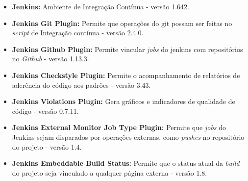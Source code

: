 \begin{apendicesenv}
\begin{itemize}
	\item \textbf{Jenkins:}	Ambiente de Integração Contínua - versão 1.642. 
	\item \textbf{Jenkins Git Plugin:}	Permite que operações do git possam ser feitas no \textit{script} de Integração contínua - versão 2.4.0.
	\item \textbf{Jenkins Github Plugin:}	Permite vincular \textit{jobs} do jenkins com repositórios no \textit{Github} - versão 1.13.3.
	\item \textbf{Jenkins Checkstyle Plugin:} Permite o acompanhamento de relatórios de aderência do código aos padrões - versão 3.43.
	\item \textbf{Jenkins Violations Plugin:} Gera gráficos e indicadores de qualidade de código - versão 0.7.11.
	\item \textbf{Jenkins External Monitor Job Type Plugin:} Permite que \textit{jobs} do Jenkins sejam disparados por operações externas, como \textit{pushes} no repositório do projeto - versão 1.4.
	\item \textbf{Jenkins Embeddable Build Status:} Permite que o status atual da \textit{build} do projeto seja vinculado a qualquer página externa - versão 1.8.  
\end{itemize}

\end{apendicesenv}
